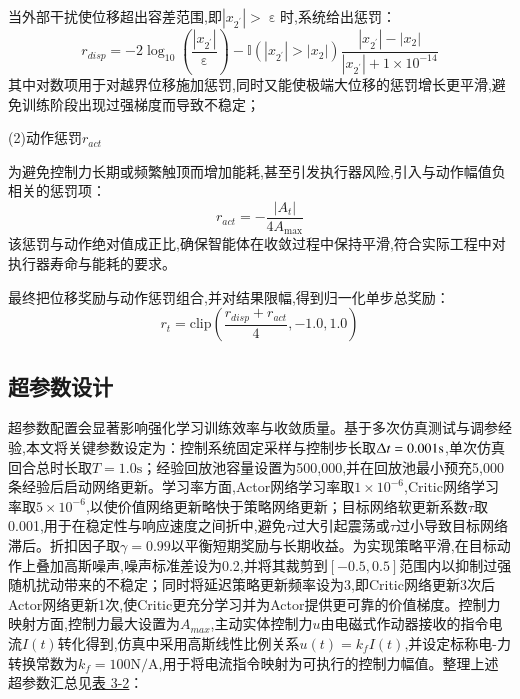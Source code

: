 \documentclass{scrbook}
\begin{document}
{当外部干扰使位移超出容差范围,即$| x_{{2^{\prime}}}| > \upepsilon $时,系统给出惩罚：
\begin{equation}
\tag{3-7}
r_{disp}=-2\log _{10}\left(\frac{| x_{{2^{\prime}}}| }{\upepsilon }\right)-\mathrm{\mathbb{I}}(| x_{{2^{\prime}}}| > | x_{2}| )\frac{| x_{{2^{\prime}}}| -| x_{2}| }{| x_{{2^{\prime}}}| +1\times 10^{-14}}
\end{equation}
其中对数项用于对越界位移施加惩罚,同时又能使极端大位移的惩罚增长更平滑,避免训练阶段出现过强梯度而导致不稳定；

(2)动作惩罚$r_{act}$

为避免控制力长期或频繁触顶而增加能耗,甚至引发执行器风险,引入与动作幅值负相关的惩罚项：
\begin{equation}
\tag{3-8}
r_{act}=-\frac{| A_{t}| }{4A_{\max }}
\end{equation}
该惩罚与动作绝对值成正比,确保智能体在收敛过程中保持平滑,符合实际工程中对执行器寿命与能耗的要求。

最终把位移奖励与动作惩罚组合,并对结果限幅,得到归一化单步总奖励：
\begin{equation}
\tag{3-9}
r_{t}=\text{clip}\left(\frac{r_{disp}+r_{act}}{4},-1.0,1.0\right)
\end{equation}
\subsection{\label{ref-049}超参数设计\label{mark-3.2.3}}

超参数配置会显著影响强化学习训练效率与收敛质量。基于多次仿真测试与调参经验,本文将关键参数设定为：控制系统固定采样与控制步长取$\Updelta t=0.001\mathrm{s}$,单次仿真回合总时长取$T=1.0\mathrm{s}$；经验回放池容量设置为500,000,并在回放池最小预充5,000条经验后启动网络更新。学习率方面,Actor网络学习率取$1\times 10^{-6}$,Critic网络学习率取$5\times 10^{-6}$,以使价值网络更新略快于策略网络更新；目标网络软更新系数$\tau $取0.001,用于在稳定性与响应速度之间折中,避免$\tau $过大引起震荡或$\tau $过小导致目标网络滞后。折扣因子取$\gamma =0.99$以平衡短期奖励与长期收益。为实现策略平滑,在目标动作上叠加高斯噪声,噪声标准差设为0.2,并将其裁剪到$[-0.5,0.5]$范围内以抑制过强随机扰动带来的不稳定；同时将延迟策略更新频率设为3,即Critic网络更新3次后Actor网络更新1次,使Critic更充分学习并为Actor提供更可靠的价值梯度。控制力映射方面,控制力最大设置为$A_{max}$,主动实体控制力$u$由电磁式作动器接收的指令电流$I(t)$转化得到,仿真中采用高斯线性比例关系$u(t)=k_{f}I(t)$,并设定标称电-力转换常数为$k_{f}=100\mathrm{N}/\mathrm{A}$,用于将电流指令映射为可执行的控制力幅值。整理上述超参数汇总见{\hyperref[ref-050]{表 3-2}}：

}
\end{document}

